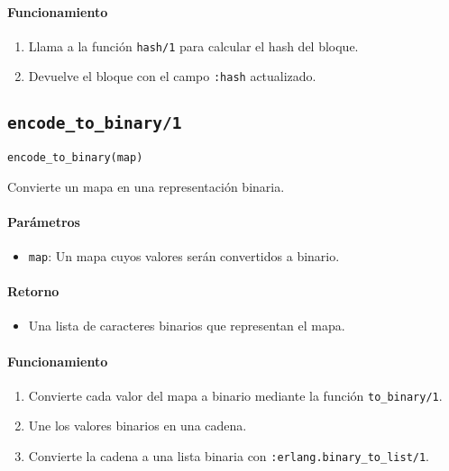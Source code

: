 {\paragraph{Funcionamiento}
\begin{enumerate}
    \item Llama a la función \texttt{hash/1} para calcular el hash del bloque.
    \item Devuelve el bloque con el campo \texttt{:hash} actualizado.
\end{enumerate}

\subsection*{\texttt{encode\_to\_binary/1}}
\begin{verbatim}
encode_to_binary(map)
\end{verbatim}

Convierte un mapa en una representación binaria.

\paragraph{Parámetros}
\begin{itemize}
    \item \texttt{map}: Un mapa cuyos valores serán convertidos a binario.
\end{itemize}

\paragraph{Retorno}
\begin{itemize}
    \item Una lista de caracteres binarios que representan el mapa.
\end{itemize}

\paragraph{Funcionamiento}
\begin{enumerate}
    \item Convierte cada valor del mapa a binario mediante la función \texttt{to\_binary/1}.
    \item Une los valores binarios en una cadena.
    \item Convierte la cadena a una lista binaria con \texttt{:erlang.binary\_to\_list/1}.
\end{enumerate}

}
